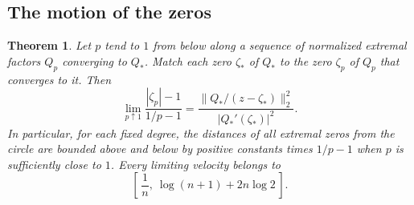 \documentclass[11pt]{article}
\newtheorem{theorem}{Theorem}
\begin{document}
\subsection{The motion of the zeros}

\begin{theorem}\label{thm:radial}
Let \(p\) tend to \(1\) from below along a sequence of normalized
extremal factors \(Q_p\) converging to \(Q_*\). Match each zero
\(\zeta_*\) of \(Q_*\) to the zero \(\zeta_p\) of \(Q_p\) that
converges to it. Then
\[
 \lim_{p\uparrow1}
 \frac{|\zeta_p|-1}{1/p-1}
 =
 \frac{\|Q_*/(z-\zeta_*)\|_2^2}{|Q_*'(\zeta_*)|^2}.
\]
In particular, for each fixed degree, the distances of all
extremal zeros from the circle are bounded above and below by
positive constants times \(1/p-1\) when \(p\) is sufficiently
close to \(1\). Every limiting velocity belongs to
\[
 \left[\,\frac1n,\ \log(n+1)+2n\log2\,\right].
\]
\end{theorem}
\end{document}
